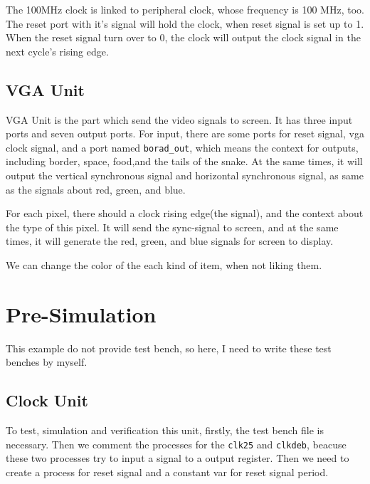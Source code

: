 \documentclass{article}
\begin{document}
    The 100MHz clock is linked to peripheral clock, whose frequency is 100 MHz, too.
    The reset port with it's signal will hold the clock, when reset signal is set up to 1.
    When the reset signal turn over to 0, the clock will output the clock signal in the next cycle's rising edge.
    
    \subsection{VGA Unit}
    \label{sec:vgaunit}
    
    VGA Unit is the part which send the video signals to screen. It has three input ports and seven output ports.
    For input, there are some ports for reset signal, vga clock signal, and a port named \verb|borad_out|,
    which means the context for outputs, including border, space, food,and the tails of the snake.
    At the same times, it will output the vertical synchronous signal and horizontal synchronous signal,
    as same as the signals about red, green, and blue.
    
    For each pixel, there should a clock rising edge(the signal), and the context about the type of this pixel.
    It will send the sync-signal to screen, and at the same times, it will generate the red, green, and blue signals for
    screen to display.
    
    We can change the color of the each kind of item, when not liking them.
     
    
    \section{Pre-Simulation}
    \label{sec:presimulation}
    
    This example do not provide test bench, so here, I need to write these test benches by myself.
    
    \subsection{Clock Unit}
    \label{sec:ps:clockunit}
    
    To test, simulation and verification this unit, firstly, the test bench file is necessary.
    Then we comment the processes for the \verb|clk25| and \verb|clkdeb|, beacuse these two processes
    try to input a signal to a output register.
    Then we need to create a process for reset signal and a constant var for reset signal period.
    
\end{document}
